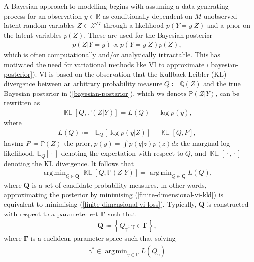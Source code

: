 \documentclass{article}
\newcommand{\KLD}{\operatorname{\mathbb{KL}}}
\newcommand{\wc}{\operatorname{{}\cdot{}}}
\DeclareMathOperator*{\argmin}{arg\,min}
\numberwithin{equation}{section}
\begin{document}
A Bayesian approach to modelling begins with assuming a data generating process for an observation $y \in \mathbb{R}$ as conditionally dependent on $M$ unobserved latent random variables $Z \in \mathcal{X}^M$ through a likelihood $p(Y=y\vert Z)$ and a prior on the latent variables $p(Z)$.
These are used for the Bayesian posterior 
\begin{align}
    p(Z \vert Y=y) \propto p(Y=y\vert Z)p(Z),
    \label{bayesian-posterior}
\end{align}
which is often computationally and/or analytically intractable.
This has motivated the need for variational methods like VI to approximate (\ref{bayesian-posterior}).
VI is based on the observation that the Kullback-Leibler (KL) divergence between an arbitrary probability measure $Q \coloneqq \mathbb{Q}(Z)$ and the true Bayesian posterior in (\ref{bayesian-posterior}), which we denote $\mathbb{P}(Z\vert Y)$, can be rewritten as
\begin{align}
    \KLD\left[Q, \mathbb{P}(Z \vert Y)\right] = L(Q) - \log p(y),
    \label{finite-dimensional-vi-kld}
\end{align}
where
\begin{align}
    L(Q) \coloneqq -\mathbb{E}_{Q}\left[\log p(y \vert Z)\right] + \KLD\left[Q, P\right],
    \label{finite-dimensional-vi-loss}
\end{align}
having $P \coloneqq \mathbb{P}(Z)$ the prior, $p(y) = \int p(y\vert z)p(z) dz$ the marginal log-likelihood, $\mathbb{E}_{Q}\left[\wc \right]$ denoting the expectation with respect to $Q$, and $\KLD\left[\wc, \wc\right]$ denoting the KL divergence.
It follows that
\begin{align}
    \argmin_{Q \in \boldsymbol{Q}} \KLD\left[Q, \mathbb{P}(Z\vert Y)\right] = \argmin_{Q \in \boldsymbol{Q}} L(Q),
    \label{optimal-approximation-vi}
\end{align}
where $\boldsymbol{Q}$ is a set of candidate probability measures.
In other words, approximating the posterior by minimising (\ref{finite-dimensional-vi-kld}) is equivalent to minimising (\ref{finite-dimensional-vi-loss}). Typically, $\boldsymbol{Q}$ is constructed with respect to a parameter set $\boldsymbol{\Gamma}$ such that
\begin{align}
    \boldsymbol{Q} \coloneqq \left\{Q_{\gamma}: \gamma \in \boldsymbol{\Gamma} \right\},
\end{align}
where $\boldsymbol{\Gamma}$ is a euclidean parameter space such that solving
\begin{align}
    \gamma^* \in \argmin_{\gamma \in \boldsymbol{\Gamma}} L(Q_{\gamma})
\end{align}
\end{document}
